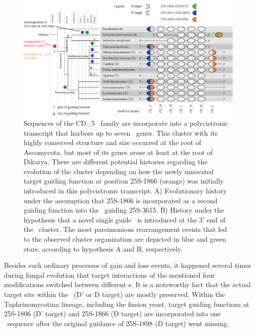\begin{figure}
  \centering
  \includegraphics[width=\textwidth]{pics/target_switches_CD_5_cluster.eps}
  \caption[Evolution of a \sno\ cluster harboring CD\_5
  sequences.]{Sequences of the CD\_5 \sno\ family are incorporate into
    a polycistronic transcript that harbors up to seven \sno\
    genes. This cluster with its highly conserved structure and size
    occurred at the root of Ascomycota, but most of its genes arose at
    least at the root of Dikarya. There are different potential
    histories regarding the evolution of the cluster depending on how
    the newly innovated target guiding function at position 25S-1866
    (orange) was initially introduced in this polycistronic
    transcript. A) Evolutionary history under the assumption that
    25S-1866 is incorporated as a second guiding function into the
    \sno\ guiding 25S-3615. B) History under the hypothesis that a
    novel single guide \sno\ is introduced at the 3' end of the \sno\
    cluster. The most parsimonious rearrangement events that led to
    the observed cluster organization are depicted in blue and green
    stars, according to hypothesis A and B, respectively.}
\label{fig:CD_5_cluster_history}
\end{figure}

Besides such ordinary processes of gain and loss events, it happened
several times during fungal evolution that target interactions of the
mentioned four modifications switched between different \sno s.  It is
a noteworthy fact that the actual target site within the \sno\ (D' or
D target) are mostly preserved. Within the Taphrinomycotina lineage,
including the fission yeast, target guiding functions at 25S-1806 (D'
target) and 25S-1866 (D target) are incorporated into one \sno\
sequence after the original guidance of 25S-1898 (D target) went
missing.

